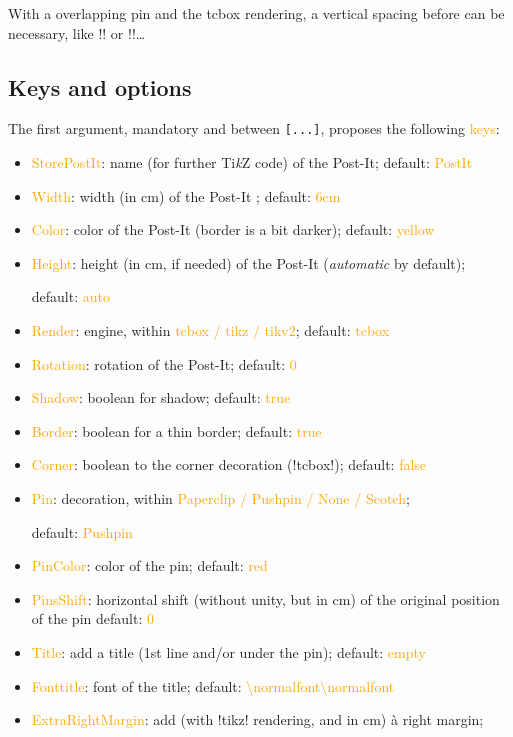 \documentclass[english,a4paper,11pt]{article}
\providecommand\tikzlogo{Ti\textit{k}Z}
\let\TikZ\tikzlogo
\newcommand\Cle[1]{{\small\sffamily\textlangle \textcolor{orange}{#1}\textrangle}}
\newcommand\cmaj[1]{\tcbox[vignetteMaJ]{#1}\xspace}
\begin{document}
\begin{warningblock}
With a overlapping pin and the \textsf{tcbox} rendering, a vertical spacing before can be necessary, like \motcletex!\vspace! or \motcletex!\bigskip!\ldots
\end{warningblock}

\subsection{Keys and options}

\begin{tipblock}
The first argument, mandatory and between \texttt{[...]}, proposes the following \Cle{keys}:

\begin{itemize}
	\item \cmaj{0.1.3} \Cle{StorePostIt}: name (for further \TikZ{} code) of the Post-It; \hfill{}default: \Cle{PostIt}
	\item \Cle{Width}: width (in cm) of the Post-It ; \hfill{}default: \Cle{6cm}
	\item \Cle{Color}: color of the Post-It (border is a bit darker); \hfill{}default: \Cle{yellow}
	\item \Cle{Height}: height (in cm, if needed) of the Post-It (\textit{automatic} by default);

	\hfill{}default: \Cle{auto}
	\item \cmaj{0.1.1} \Cle{Render}: engine, within \Cle{tcbox / tikz / tikv2}; \hfill{}default: \Cle{tcbox}
	\item \Cle{Rotation}: rotation of the Post-It; \hfill{}default: \Cle{0}
	\item \Cle{Shadow}: boolean for shadow; \hfill{}default: \Cle{true}
	\item \Cle{Border}: boolean for a thin border; \hfill{}default: \Cle{true}
	\item \Cle{Corner}: boolean to the corner decoration (\motcletex!tcbox!); \hfill{}default: \Cle{false}
	\item \Cle{Pin}: decoration, within \Cle{Paperclip / Pushpin / None / Scotch};

	\hfill{}default: \Cle{Pushpin}
	\item \Cle{PinColor}: color of the pin; \hfill{}default: \Cle{red}
	\item \Cle{PinsShift}: horizontal shift (without unity, but in cm) of the original position of the pin \hfill{}default: \Cle{0}
	\item \cmaj{0.1.1} \Cle{Title}: add a title (1st line and/or under the pin); \hfill{}default: \Cle{empty}
	\item \cmaj{0.1.1} \Cle{Fonttitle}: font of the title; \hfill{}default: \Cle{\textbackslash normalfont\textbackslash normalfont}
	\item \cmaj{0.1.1} \Cle{ExtraRightMargin}: add (with \packagetex!tikz! rendering, and in cm) à right margin;


\end{itemize}
\end{tipblock}
\end{document}
